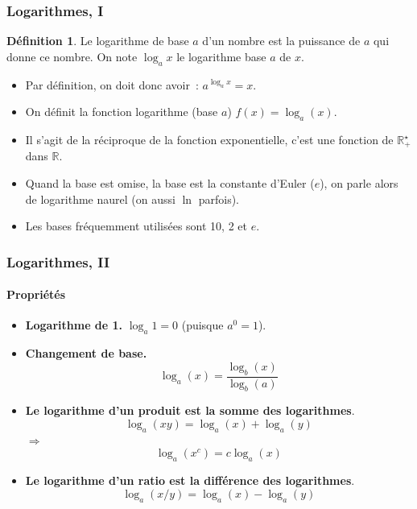 \documentclass[10pt,notheorems]{beamer}
\theoremstyle{plain}
\theoremstyle{definition} %
\newtheorem{definition}{Définition}
\begin{document}
\begin{frame}
  \frametitle{Logarithmes, I}

  \begin{definition}
    Le logarithme de base $a$ d'un nombre est la puissance de $a$ qui donne ce nombre. On note $\log_a x$ le logarithme base $a$ de $x$.
  \end{definition}

  \bigskip

  \begin{itemize}

  \item Par définition, on doit donc avoir~: $a^{\log_a x} = x$.\newline

  \item On définit la fonction logarithme (base $a$) $f(x) = \log_a(x)$.\newline

  \item Il s'agit de la réciproque de la fonction exponentielle, c'est une fonction de $\mathbb R_+^{\star}$ dans $\mathbb R$.\newline

  \item Quand la base est omise, la base est la constante d'Euler ($e$), on parle alors de logarithme naurel (on aussi $\ln$ parfois).\newline

  \item Les bases fréquemment utilisées sont 10, 2 et $e$.

  \end{itemize}

\end{frame}


\begin{frame}
  \frametitle{Logarithmes, II}
  \framesubtitle{Propriétés}

  \bigskip

  \begin{itemize}

  \item \textbf{Logarithme de 1.} $\log_a 1 = 0$ (puisque $a^0 = 1$).\newline

  \item \textbf{Changement de base.}
    \[
      \log_a(x) = \frac{\log_b(x)}{\log_b(a)}
    \]

    \bigskip

  \item \textbf{Le logarithme d'un produit est la somme des logarithmes}.
    \[
      \log_a(xy) = \log_a(x)+\log_a(y)
    \]
    $\Rightarrow$
    \[
      \log_a \left(x^c\right) = c \log_a (x)
    \]

    \bigskip

  \item \textbf{Le logarithme d'un ratio est la différence des logarithmes}.
    \[
      \log_a(x/y) = \log_a(x)-\log_a(y)
    \]


  \end{itemize}

\end{frame}
\end{document}
